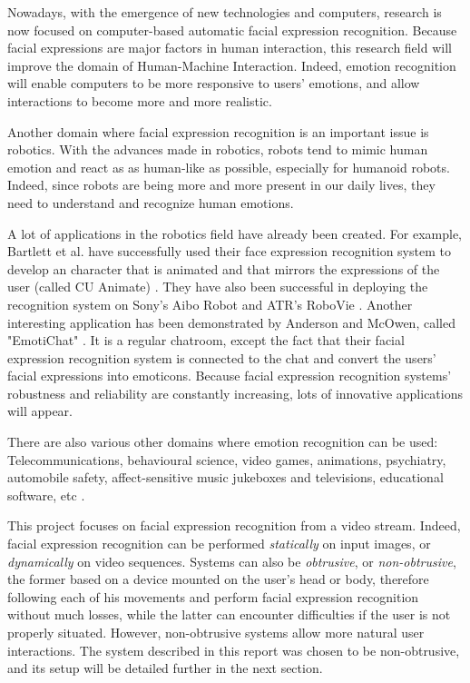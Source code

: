 \noindent Nowadays, with the emergence of new technologies and computers, research is now focused on computer-based automatic facial expression recognition. Because facial expressions are major factors in human interaction, this research field will improve the domain of Human-Machine Interaction. Indeed, emotion recognition will enable computers to be more responsive to users' emotions, and allow interactions to become more and more realistic. 
\newline

\noindent Another domain where facial expression recognition is an important issue is robotics. With the advances made in robotics, robots tend to mimic human emotion and react as as human-like as possible, especially for humanoid robots. Indeed, since robots are being more and more present in our daily lives, they need to understand and recognize human emotions.
\newline

\noindent A lot of applications in the robotics field have already been created. For example, Bartlett et al. have successfully used their face expression recognition system to develop an character that is animated and that mirrors the expressions of the user (called CU Animate) \cite{BAR03}. They have also been successful in deploying the recognition system on Sony's Aibo Robot and ATR's RoboVie \cite{BAR03}. Another interesting application has been demonstrated by Anderson and McOwen, called "EmotiChat" \cite{AND06}. It is a regular chatroom, except the fact that their facial expression recognition system is connected to the chat and convert the users' facial expressions into emoticons. Because facial expression recognition systems' robustness and reliability are constantly increasing, lots of innovative applications will appear.
\newline

\noindent There are also various other domains where emotion recognition can be used: Telecommunications, behavioural science, video games, animations, psychiatry, automobile safety, affect-sensitive music jukeboxes and televisions, educational software, etc \cite{BET12}.
\newline

\noindent This project focuses on facial expression recognition from a video stream. Indeed, facial expression recognition can be performed \textit{statically} on input images, or \textit{dynamically} on video sequences. Systems can also be \textit{obtrusive}, or \textit{non-obtrusive}, the former based on a device mounted on the user's head or body, therefore following each of his movements and perform facial expression recognition without much losses, while the latter can encounter difficulties if the user is not properly situated. However, non-obtrusive systems allow more natural user interactions. The system described in this report was chosen to be non-obtrusive, and its setup will be detailed further in the next section.
\newline